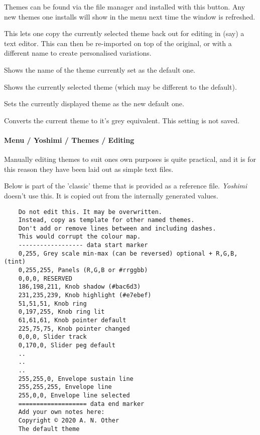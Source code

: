     {}Themes can be found via the file manager and
   installed with this button. Any new themes one installs will show in the menu
   next time the window is refreshed.

    {}This lets one copy the currently selected theme back
   out for editing in (say) a text editor. This can then be re-imported on top of
   the original, or with a different name to create personalised variations.

    {}Shows the name of the theme currently set as
   the default one.

     {}Shows the currently selected theme (which
    may be different to the default).

    {}Sets the currently displayed theme as the new default
   one.

    {}Converts the current theme to it's grey equivalent. This
   setting is not saved.

\paragraph{Menu / Yoshimi / Themes / Editing}
\label{paragraph:menu_yoshimi_themes_editing}
   Manually editing themes to suit ones own purposes is quite practical, and it
   is for this reason they have been laid out as simple text files.

   Below is part of the 'classic' theme that is provided as a reference file.
   \textsl{Yoshimi} doesn't use this. It is copied out from the internally
   generated values.

   \begin{verbatim}
    Do not edit this. It may be overwritten.
    Instead, copy as template for other named themes.
    Don't add or remove lines between and including dashes.
    This would corrupt the colour map.
    ------------------ data start marker
    0,255, Grey scale min-max (can be reversed) optional + R,G,B, (tint)
    0,255,255, Panels (R,G,B or #rrggbb)
    0,0,0, RESERVED
    186,198,211, Knob shadow (#bac6d3)
    231,235,239, Knob highlight (#e7ebef)
    51,51,51, Knob ring
    0,197,255, Knob ring lit
    61,61,61, Knob pointer default
    225,75,75, Knob pointer changed
    0,0,0, Slider track
    0,170,0, Slider peg default
    ..
    ..
    ..
    255,255,0, Envelope sustain line
    255,255,255, Envelope line
    255,0,0, Envelope line selected
    =================== data end marker
    Add your own notes here:
    Copyright © 2020 A. N. Other
    The default theme
   \end{verbatim}

